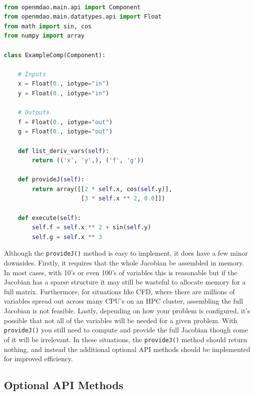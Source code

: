 \documentclass[]{aiaa-tc} %
\begin{document}
\begin{minipage}{\linewidth}
\begin{lstlisting}[label=code:component_with_jacobian,caption=Example OpenMDAO
component with user-specified Jacobian,
language=Python, basicstyle=\ttfamily\scriptsize,
           keywordstyle=\color{blue}\ttfamily,
           stringstyle=\color{red}\ttfamily, showstringspaces=false,
           commentstyle=\color{olive}\ttfamily]

from openmdao.main.api import Component
from openmdao.main.datatypes.api import Float
from math import sin, cos
from numpy import array

class ExampleComp(Component):

    # Inputs
    x = Float(0., iotype="in")
    y = Float(0., iotype="in")

    # Outputs
    f = Float(0., iotype="out")
    g = Float(0., iotype="out")

    def list_deriv_vars(self):
        return (('x', 'y',), ('f', 'g'))

    def provideJ(self):
        return array([[2 * self.x, cos(self.y)],
                      [3 * self.x ** 2, 0.0]])

    def execute(self):
        self.f = self.x ** 2 + sin(self.y)
        self.g = self.x ** 3

\end{lstlisting}
\end{minipage}

        Although the \texttt{provideJ()} method is easy to implement, it does have a few minor downsides. Firstly,
        it requires that the whole Jacobian be assembled in memory. In most cases, with 10's or even 100's of variables
        this is reasonable but if the Jacobian has a sparse structure it may still be wasteful to allocate memory for a
        full matrix. Furthermore, for situations like CFD, where there are millions of variables spread out
        across many CPU's on an HPC cluster, assembling the full Jacobian is not feasible. Lastly, depending on how
        your problem is configured, it's possible that not all of the variables will be needed for a given problem. With
        \texttt{provideJ()} you still need to compute and provide the full Jacobian though some of it will be irrelevant.
        In these situations, the \texttt{provideJ()} method should return nothing, and instead the
        additional optional API methods should be implemented for improved efficiency.

    \subsection{Optional API Methods}
\end{document}
